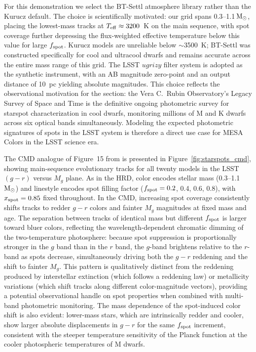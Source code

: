 \documentclass[linenumbers,apj,twocolumn, floatfix]{aastex701}
\begin{document}
For this demonstration we select the BT-Settl atmosphere library \citep{Allard2012} rather than the Kurucz default.
The choice is scientifically motivated: our grid spans 0.3--1.1\,$\rm M_\odot$, placing the lowest-mass tracks at $T_{\rm eff} \approx 3200$~K on the main sequence, with spot coverage further depressing the flux-weighted effective temperature below this value for large $f_{\rm spot}$.
Kurucz models are unreliable below $\sim$3500~K; BT-Settl was constructed specifically for cool and ultracool dwarfs and remains accurate across the entire mass range of this grid.
The LSST $ugrizy$ filter system is adopted as the synthetic instrument, with an AB magnitude zero-point and an output distance of 10~pc yielding absolute magnitudes.
This choice reflects the observational motivation for the section: the Vera C.\ Rubin Observatory's Legacy Survey of Space and Time \citep{LSST} is the definitive ongoing photometric survey for starspot characterization in cool dwarfs, monitoring millions of M and K dwarfs across six optical bands simultaneously.
Modeling the expected photometric signatures of spots in the LSST system is therefore a direct use case for MESA Colors in the LSST science era.

The CMD analogue of Figure~15 from \citet{Jermyn2023} is presented in Figure~\ref{fig:starspots_cmd}, showing main-sequence evolutionary tracks for all twenty models in the LSST $(g-r)$ versus $M_g$ plane.
As in the HRD, color encodes stellar mass (0.3--1.1\,$\rm M_\odot$) and linestyle encodes spot filling factor ($f_{\rm spot} = 0.2$, 0.4, 0.6, 0.8), with $x_{\rm spot} = 0.85$ fixed throughout.
In the CMD, increasing spot coverage consistently shifts tracks to redder $g-r$ colors and fainter $M_g$ magnitudes at fixed mass and age.
The separation between tracks of identical mass but different $f_{\rm spot}$ is larger toward bluer colors, reflecting the wavelength-dependent chromatic dimming of the two-temperature photosphere: because spot suppression is proportionally stronger in the $g$ band than in the $r$ band, the $g$-band brightens relative to the $r$-band as spots decrease, simultaneously driving both the $g-r$ reddening and the shift to fainter $M_g$.
This pattern is qualitatively distinct from the reddening produced by interstellar extinction (which follows a reddening law) or metallicity variations (which shift tracks along different color-magnitude vectors), providing a potential observational handle on spot properties when combined with multi-band photometric monitoring.
The mass dependence of the spot-induced color shift is also evident: lower-mass stars, which are intrinsically redder and cooler, show larger absolute displacements in $g-r$ for the same $f_{\rm spot}$ increment, consistent with the steeper temperature sensitivity of the Planck function at the cooler photospheric temperatures of M dwarfs.
\end{document}

